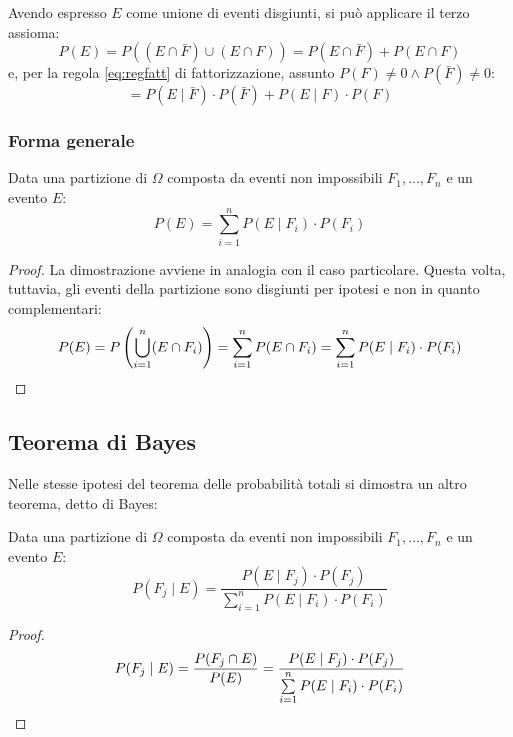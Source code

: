 Avendo espresso $E$ come unione di eventi disgiunti, si può applicare il terzo assioma:
\begin{equation*}
	P(E) = P((E \cap \bar F)\cup(E \cap F)) = P(E \cap \bar F)+P(E \cap F)
\end{equation*}
e, per la regola \eqref{eq:regfatt} di fattorizzazione, assunto $P(F)\neq 0 \land P(\bar F)\neq 0$:
\begin{equation*}
	=P(E\mid \bar F)\cdot P(\bar F) + P(E \mid F)\cdot P(F)
\end{equation*}

\subsubsection{Forma generale}
\begin{teor}
	Data una partizione di $\Omega$ composta da eventi non impossibili $F_1,\dots, F_n$ e un evento $E$:
	\begin{equation*}
		P(E)= \sum_{i=1}^n P(E \mid F_i)\cdot P(F_i)
	\end{equation*}
\end{teor}
\begin{proof}
	La dimostrazione avviene in analogia con il caso particolare. Questa volta, tuttavia, gli eventi della partizione sono disgiunti per ipotesi e non in quanto complementari:
	\begin{equation*}
		P(E)=P \left(\bigcup_{i=1}^n (E\cap F_i) \right) = \sum_{i=1}^n P(E\cap F_i) = \sum_{i=1}^n P(E \mid F_i)\cdot P(F_i) \qedhere
	\end{equation*}
\end{proof}


\subsection{Teorema di Bayes}
Nelle stesse ipotesi del teorema delle probabilità totali si dimostra un altro teorema, detto di Bayes:
\begin{teor}[di Bayes]
	Data una partizione di $\Omega$ composta da eventi non impossibili $F_1,\dots, F_n$ e un evento $E$:
	\begin{equation*}
		P(F_j\mid E)=\frac{P(E\mid F_j)\cdot P(F_j)}{\sum\limits_{i=1}^n P(E \mid F_i)\cdot P(F_i)}
	\end{equation*}
\end{teor}

\begin{proof}
	\begin{equation*}
		P(F_j\mid E)=\frac{P(F_j \cap E)}{P(E)}=\frac{P(E\mid F_j)\cdot P(F_j)}{\sum\limits_{i=1}^n P(E \mid F_i)\cdot P(F_i)} \qedhere
	\end{equation*}
\end{proof}



